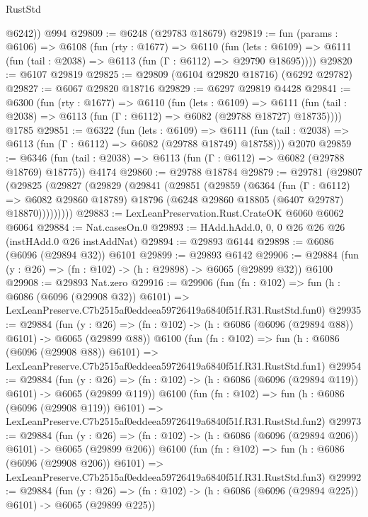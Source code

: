\begin{lexlean}{RustStd}
\begin{coremodule}
        @6242))
    @994
@29809 := @6248 (@29783 @18679)
@29819 := fun (params : @6106) =>
  @6108
    (fun (rty : @1677) =>
    @6110
      (fun (lets : @6109) =>
      @6111 (fun (tail : @2038) => @6113 (fun (Γ : @6112) => @29790 @18695))))
@29820 := @6107 @29819
@29825 := @29809 (@6104 @29820 @18716) (@6292 @29782)
@29827 := @6067 @29820 @18716
@29829 := @6297 @29819 @4428
@29841 := @6300
    (fun (rty : @1677) =>
    @6110
      (fun (lets : @6109) =>
      @6111 (fun (tail : @2038) => @6113 (fun (Γ : @6112) => @6082 (@29788 @18727) @18735))))
    @1785
@29851 := @6322
    (fun (lets : @6109) =>
    @6111 (fun (tail : @2038) => @6113 (fun (Γ : @6112) => @6082 (@29788 @18749) @18758)))
    @2070
@29859 := @6346
    (fun (tail : @2038) => @6113 (fun (Γ : @6112) => @6082 (@29788 @18769) @18775))
    @4174
@29860 := @29788 @18784
@29879 := @29781
    (@29807
      (@29825
        (@29827
          (@29829
            (@29841
              (@29851
                (@29859
                  (@6364
                    (fun (Γ : @6112) => @6082 @29860 @18789)
                    @18796
                    (@6248 @29860 @18805 (@6407 @29787) @18870)))))))))
@29883 := LexLeanPreservation.Rust.CrateOK @6060 @6062 @6064
@29884 := Nat.casesOn.{0}
@29893 := HAdd.hAdd.{0, 0, 0} @26 @26 @26 (instHAdd.{0} @26 instAddNat)
@29894 := @29893 @6144
@29898 := @6086 (@6096 (@29894 @32)) @6101
@29899 := @29893 @6142
@29906 := @29884 (fun (y : @26) => (fn : @102) -> (h : @29898) -> @6065 (@29899 @32)) @6100
@29908 := @29893 Nat.zero
@29916 := @29906
    (fun (fn : @102) =>
    fun (h : @6086 (@6096 (@29908 @32)) @6101) =>
    LexLeanPreserve.C7b2515af0eddeea59726419a6840f51f.R31.RustStd.fun0)
@29935 := @29884
    (fun (y : @26) => (fn : @102) -> (h : @6086 (@6096 (@29894 @88)) @6101) -> @6065 (@29899 @88))
    @6100
    (fun (fn : @102) =>
    fun (h : @6086 (@6096 (@29908 @88)) @6101) =>
    LexLeanPreserve.C7b2515af0eddeea59726419a6840f51f.R31.RustStd.fun1)
@29954 := @29884
    (fun (y : @26) => (fn : @102) -> (h : @6086 (@6096 (@29894 @119)) @6101) -> @6065 (@29899 @119))
    @6100
    (fun (fn : @102) =>
    fun (h : @6086 (@6096 (@29908 @119)) @6101) =>
    LexLeanPreserve.C7b2515af0eddeea59726419a6840f51f.R31.RustStd.fun2)
@29973 := @29884
    (fun (y : @26) => (fn : @102) -> (h : @6086 (@6096 (@29894 @206)) @6101) -> @6065 (@29899 @206))
    @6100
    (fun (fn : @102) =>
    fun (h : @6086 (@6096 (@29908 @206)) @6101) =>
    LexLeanPreserve.C7b2515af0eddeea59726419a6840f51f.R31.RustStd.fun3)
@29992 := @29884
    (fun (y : @26) => (fn : @102) -> (h : @6086 (@6096 (@29894 @225)) @6101) -> @6065 (@29899 @225))

\end{coremodule}
\end{lexlean}
